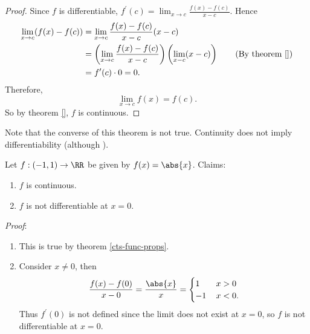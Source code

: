 \documentclass[../real_analysis.tex]{subfiles}
\begin{document}
        \begin{proof}
            Since $f$ is differentiable, $f^\prime(c)=\lim_{x\to c}\frac{f(x)-f(c)}{x-c}$. Hence
            \begin{align}
                \lim_{x\to c}(f(x)-f(c))&=\lim_{x\to c}\frac{f(x)-f(c)}{x-c}(x-c)\\
                &=\left(\lim_{x\to c}\frac{f(x)-f(c)}{x-c}\right)\left(\lim_{x-c}(x-c)\right)\tag{By theorem \ref{}}\\ %
                &=f^\prime(c)\cdot0=0.
            \end{align}
            Therefore,
            \begin{equation}
                \lim_{x\to c}f(x)=f(c).
            \end{equation}
            So by theorem \ref{}, $f$ is continuous. %
        \end{proof}
        Note that the converse of this theorem is not true. Continuity does not imply differentiability (although ).
        \begin{example}
            Let $f:(-1,1)\to\RR$ be given by $f(x)=\abs{x}$. Claims:
            \begin{enumerate}[label={\upshape(\roman*)}]
                \item $f$ is continuous.
                \item $f$ is not differentiable at $x=0$.
            \end{enumerate}
            \textit{Proof}:
            \begin{enumerate}[label={\upshape(\roman*)}]
                \item This is true by theorem \ref{cts-func-props}.
                \item Consider $x\neq 0$, then
                \begin{equation}
                    \frac{f(x)-f(0)}{x-0}=\frac{\abs{x}}{x}=\begin{cases}
                        1\,&x>0\\
                        -1\,&x<0.
                    \end{cases}
                \end{equation}
                Thus $f^\prime(0)$ is not defined since the limit does not exist at $x=0$, so $f$ is not differentiable at $x=0$.
            \end{enumerate}
        \end{example}
\end{document}

